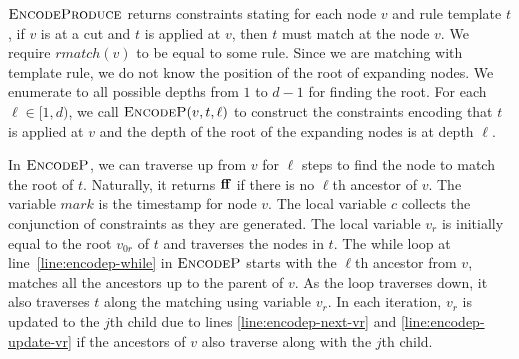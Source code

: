 $\textsc{EncodeProduce}$ returns constraints stating for each node $v$
and rule template $t$,
if $v$ is at a cut and $t$ is applied at $v$, then $t$ must match
at the node $v$.
We require $rmatch(v)$ to be equal to some rule.
Since we are matching with template rule, we do not know the
position of the root of expanding nodes.
We enumerate to all possible depths from $1$ to $d-1$ for finding
the root.
For each $\ell \in [1,d)$, we call $\textsc{EncodeP}( v, t, \ell)$
to construct the constraints encoding that $t$ is applied at $v$
and the depth of the root of the expanding nodes is at depth $\ell$.

In $\textsc{EncodeP}$, we can traverse up from $v$ for $\ell$ steps to
find the node to match the root of $t$.
Naturally, it returns $\mathbf{ff}$ if there
is no $\ell$th ancestor of $v$. %
The variable $mark$ is the timestamp for node $v$.
The local variable $c$ collects the conjunction of constraints as they are
generated. %
The local variable $v_r$ is initially equal to the root $v_{0r}$ of $t$
and traverses the nodes in $t$.
The while loop at line~\ref{line:encodep-while} in $\textsc{EncodeP}$ starts with
the $\ell$th ancestor from $v$,
matches all the ancestors up to the parent of $v$.
As the loop traverses down, it also traverses $t$ along the matching
using variable $v_r$.
In each iteration, $v_r$ is updated to the $j$th child due to lines
\ref{line:encodep-next-vr} and \ref{line:encodep-update-vr}
if the ancestors of $v$ also traverse along with the $j$th child.


